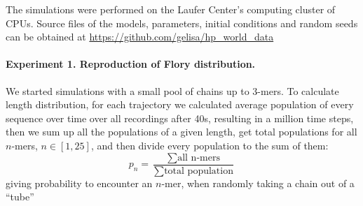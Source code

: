 \documentclass[journal=jacsat,manuscript=article,layout=twocolumn]{achemso}
\newcommand*{\ga}{\alpha}
\begin{document}
The simulations were performed on the Laufer Center's computing cluster of CPUs. 
Source files of the models, parameters, initial conditions and random seeds can be obtained at 
\url{https://github.com/gelisa/hp_world_data}

\paragraph{Experiment 1. Reproduction of Flory distribution.}\label{sec:expt1}
We started simulations with a small pool of chains up to 3-mers. To calculate length distribution, 
for each trajectory we calculated average population of every sequence over time over all 
recordings 
after 40s, resulting in a million time steps, then we sum up all the populations of a given 
length, 
get total populations for all $n$-mers, $n\in[1,25]$, and then divide every population to the sum 
of them:
\begin{equation}
 p_n = \frac{\sum\mbox{all n-mers}}{\sum\mbox{total population}}
\end{equation}
giving probability to encounter an $n$-mer, when randomly taking a chain out of a ``tube''
\end{document}
